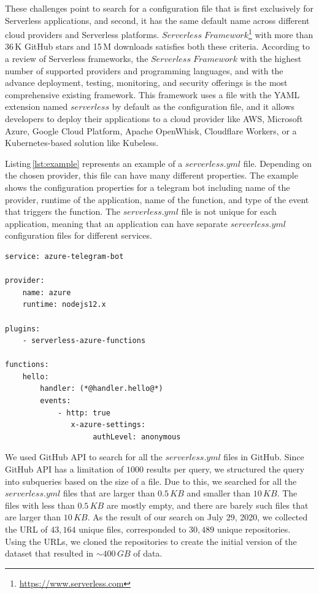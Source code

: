 These challenges point to search for a configuration file that is first exclusively 
for Serverless applications, and second, it has the same default name across 
different cloud providers and Serverless platforms. 
$Serverless \; Framework$\footnote{\url{https://www.serverless.com}} 
with more than 36\,K GitHub stars and 15\,M downloads satisfies both these 
criteria. According to a review of Serverless frameworks\cite{kritikos2018review}, 
the $Serverless \; Framework$ with the highest number of supported providers 
and programming languages, and with the advance deployment, testing, 
monitoring, and security offerings is the most comprehensive existing framework. 
This framework uses a file with the YAML extension named $serverless$ 
by default as the configuration file, and it allows developers to deploy their 
applications to a cloud provider like AWS, Microsoft Azure, Google Cloud 
Platform, Apache OpenWhisk, Cloudflare Workers, or a Kubernetes-based 
solution like Kubeless.

Listing\,\ref{lst:example} represents an example of a $serverless.yml$ file. 
Depending on the chosen provider, this file can have many different properties.
The example shows the configuration properties for a telegram bot including 
name of the provider, runtime of the application, name of the function, 
and type of the event that triggers the function. The $serverless.yml$ file is 
not unique for each application, meaning that an application can have separate
$serverless.yml$ configuration files for different services.

\vspace{2mm}

\begin{lstlisting}[frame=single, caption=An example of a serverless.yml file., label={lst:example}, captionpos=b]
service: azure-telegram-bot 

provider:  
	name: azure
	runtime: nodejs12.x  
	
plugins:  
	- serverless-azure-functions 

functions:
	hello:    
		handler: (*@handler.hello@*)
		events:   
			- http: true        
			   x-azure-settings:          
			   		authLevel: anonymous
\end{lstlisting}

\vspace{2mm}

We used GitHub API to search for all the $serverless.yml$ files in GitHub. 
Since GitHub API has a limitation of $1000$ results per query, we structured 
the query into subqueries based on the size of a file. 
Due to this, we searched for all the $serverless.yml$ files that are larger 
than $0.5\,KB$ and smaller than $10\,KB$. The files with less than 
$0.5\,KB$ are mostly empty, and there are barely such files that are 
larger than $10\,KB$. As the result of our search on July 29, 2020, 
we collected the URL of $43,164$ unique files, corresponded to 
$30,489$ unique repositories. Using the URLs, we cloned 
the repositories to create the initial version of the dataset that 
resulted in $\sim 400 \, GB$ of data.

